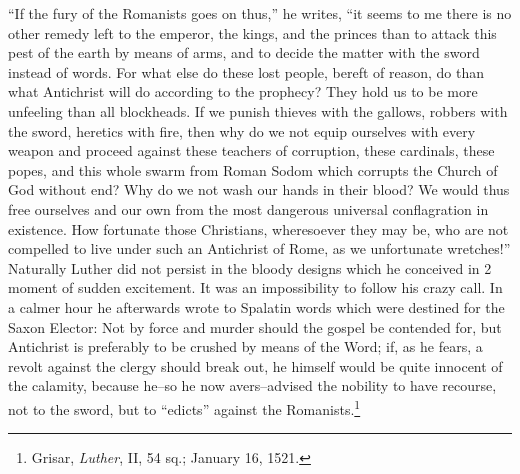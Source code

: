 “If the fury of the Romanists goes on thus,” he writes, “it seems to me
there is no other remedy left to the emperor, the kings, and the princes than
to attack this pest of the earth by means of arms, and to decide the matter
with the sword instead of words. For what else do these lost people, bereft
of reason, do than what Antichrist will do according to the prophecy? They
hold us to be more unfeeling than all blockheads. If we punish thieves with
the gallows, robbers with the sword, heretics with fire, then why do we not
equip ourselves with every weapon and proceed against these teachers of corruption,
these cardinals, these popes, and this whole swarm from Roman
Sodom which corrupts the Church of God without end? Why do we not
wash our hands in their blood? We would thus free ourselves and our own
from the most dangerous universal conflagration in existence. How fortunate
those Christians, wheresoever they may be, who are not compelled to live
under such an Antichrist of Rome, as we unfortunate wretches!”
Naturally Luther did not persist in the bloody designs which he
conceived in 2 moment of sudden excitement. It was an impossibility
to follow his crazy call. In a calmer hour he afterwards wrote to
Spalatin words which were destined for the Saxon Elector: Not by
force and murder should the gospel be contended for, but Antichrist
is preferably to be crushed by means of the Word; if, as he fears,
a revolt against the clergy should break out, he himself would be
quite innocent of the calamity, because he--so he now avers--advised
the nobility to have recourse, not to the sword, but to “edicts”
against the Romanists.\footnote{Grisar, \textit{Luther}, II, 54 sq.; January 16, 1521.}

